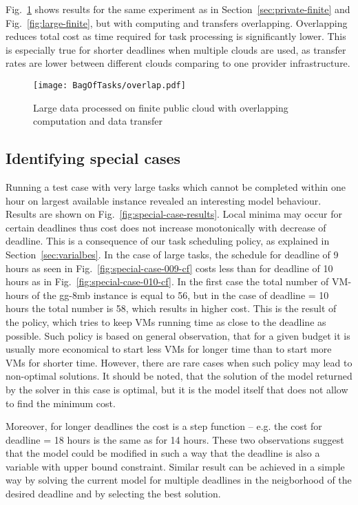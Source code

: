 {  Fig.~\ref{fig:large-finite-overlap} shows results for the same experiment as in Section~\ref{sec:private-finite} and Fig.~\ref{fig:large-finite}, but with computing and transfers overlapping. Overlapping reduces total cost as time required for task processing is significantly lower.  This is especially true for shorter deadlines when multiple  clouds are used, as transfer rates are lower between different clouds comparing to one provider infrastructure.
  
  \begin{figure}[tb]
     \centering
     \texttt{[image: BagOfTasks/overlap.pdf]}
     \caption{Large data processed on finite public cloud with overlapping computation and data transfer\label{fig:large-finite-overlap}}
  \end{figure}  

\subsection{Identifying special cases}
\label{sec:special}
  
  Running a test case with very large tasks which cannot be completed within one hour on largest available instance revealed an interesting model behaviour. Results are shown on Fig.~\ref{fig:special-case-results}. Local minima may occur for certain deadlines thus cost does not increase monotonically with decrease of deadline. This is a consequence of our task scheduling policy, as explained in Section~\ref{sec:varialbes}. In the case of large tasks, the schedule for deadline of 9 hours  as seen in Fig.~\ref{fig:special-case-009-cf} costs less than for deadline of 10 hours as in Fig.~\ref{fig:special-case-010-cf}. In the first case the total number of VM-hours of the gg-8mb instance is equal to 56, but in the case of deadline = 10 hours the total number is 58, which results in higher cost. This is the result of the policy, which tries to keep VMs running time as close to the deadline as possible. Such policy is based on general observation, that for a given budget it is usually more economical to start less VMs for longer time than to start more VMs for shorter time. However, there are rare cases when such policy may lead to non-optimal solutions. It should be noted, that the solution of the model returned by the solver in this case is optimal, but it is the model itself that does not allow to find the minimum cost.
  
  Moreover, for longer deadlines the cost is a step function -- e.g. the cost for deadline = 18 hours is the same as for 14 hours. These two observations suggest that the model could be modified in such a way that the deadline is also a variable with upper bound constraint. Similar result can be achieved in a simple way by solving the current model for multiple deadlines in the neigborhood of the desired deadline and by selecting the best solution.  
  
}
